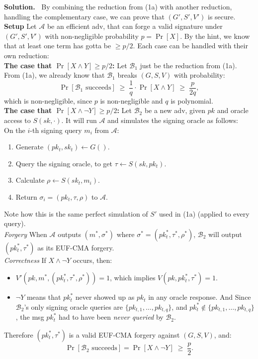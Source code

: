 \documentclass[12pt]{article}
\theoremstyle{definition}
\newcommand{\addbigskip}{\addvspace{\bigskipamount}}
\newenvironment{solution}
     {\addbigskip
      \noindent\color{blue}\textbf{Solution.\ }}
     {\par\addbigskip}
\newenvironment{solution}
     {\comment}
     {\endcomment}
\newcommand{\B}{\mathcal{B}}
\begin{document}
\begin{solution}
By combining the reduction from (1a) with another reduction, handling the complementary case, we can prove that $(G', S', V')$ is secure.\\


\noindent\textbf{Setup}
Let $\mathcal{A}$ be an efficient adv, that can forge a valid signature under $(G', S', V')$ with non-negligible probability $p = \Pr[X]$.
By the hint, we know that at least one term has gotta be $\geq p/2$. Each case can be handled with their own reduction:\\


\noindent\textbf{The case that $\Pr[X \wedge Y] \geq p/2$:}
Let $\mathcal{B}_1$ just be the reduction from (1a). From (1a), we already know that $\B_1$ breaks $(G, S, V)$ with probability:
\[
\Pr[\mathcal{B}_1 \text{ succeeds}] \;\geq\; \frac{1}{q} \cdot \Pr[X \wedge Y] \;\geq\; \frac{p}{2q},
\]
which is non-negligible, since $p$ is non-negligible and $q$ is polynomial.\\


\noindent\textbf{The case that $\Pr[X \wedge \lnot Y] \geq p/2$:}
Let $\mathcal{B}_2$ be a new adv, given $pk$ and oracle access to $S(sk, \cdot)$.
It will run $\mathcal{A}$ and simulates the signing oracle as follows:\\

\noindent 
On the $i$-th signing query $m_i$ from $\mathcal{A}$:
\begin{enumerate}
    \item Generate $(pk_t, sk_t) \leftarrow G()$.
    \item Query the signing oracle, to get $\tau \leftarrow S(sk, pk_t)$.
    \item Calculate $\rho \leftarrow S(sk_t, m_i)$.
    \item Return $\sigma_i = (pk_t, \tau, \rho)$ to $\mathcal{A}$.
\end{enumerate}
Note how this is the same perfect simulation of $S'$ used in (1a) (applied to every query).\\


\noindent\textit{Forgery}
When $\mathcal{A}$ outputs $(m^*, \sigma^*)$ where $\sigma^* = (pk_t^*, \tau^*, \rho^*)$, $\mathcal{B}_2$ will output $(pk_t^*, \tau^*)$ as its EUF-CMA forgery.\\


\noindent\textit{Correctness}
If $X \wedge \lnot Y$ occurs, then:
\begin{itemize}
    \item $V'(pk, m^*, (pk_t^*, \tau^*, \rho^*)) = 1$, which implies $V(pk, pk_t^*, \tau^*) = 1$.
    \item $\lnot Y$ means that $pk_t^*$ never showed up as $pk_t$ in any oracle response.
    And Since $\mathcal{B}_2$'s only signing oracle queries are $\{pk_{t,1}, \dots, pk_{t,q}\}$,
    and $pk_t^* \notin \{pk_{t,1}, \dots, pk_{t,q}\}$, the msg $pk_t^*$
    had to have been \emph{never queried} by $\mathcal{B}_2$.
\end{itemize}
Therefore $(pk_t^*, \tau^*)$ is a valid EUF-CMA forgery against $(G, S, V)$, and:
\[
\Pr[\mathcal{B}_2 \text{ succeeds}] = \Pr[X \wedge \lnot Y] \;\geq\; \frac{p}{2}.
\]\\



\end{solution}
\end{document}
